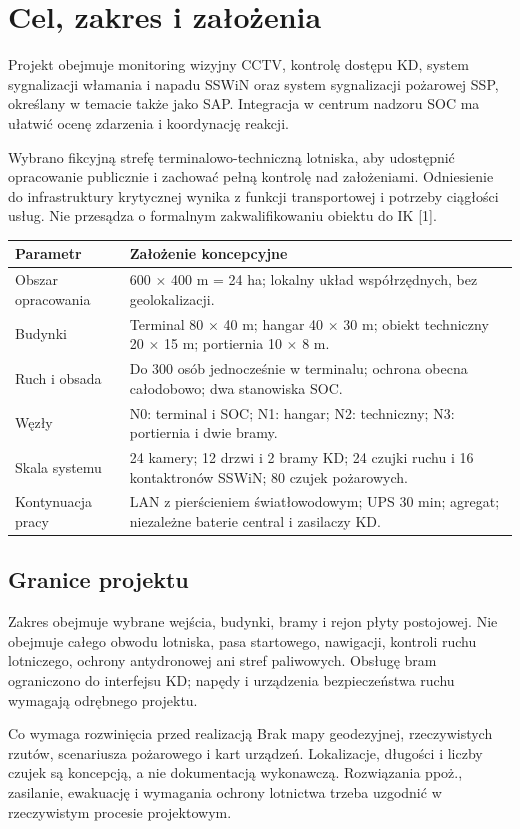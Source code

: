\section{Cel, zakres i założenia}
Projekt obejmuje monitoring wizyjny CCTV, kontrolę dostępu KD, system sygnalizacji włamania i napadu SSWiN oraz system sygnalizacji pożarowej SSP, określany w temacie także jako SAP. Integracja w centrum nadzoru SOC ma ułatwić ocenę zdarzenia i koordynację reakcji.

Wybrano fikcyjną strefę terminalowo-techniczną lotniska, aby udostępnić opracowanie publicznie i zachować pełną kontrolę nad założeniami. Odniesienie do infrastruktury krytycznej wynika z funkcji transportowej i potrzeby ciągłości usług. Nie przesądza o formalnym zakwalifikowaniu obiektu do IK [1].

\begin{tabularx}{\linewidth}{@{}P{42mm}Y@{}}
\toprule\textbf{Parametr} & \textbf{Założenie koncepcyjne}\\\midrule
Obszar opracowania & 600 $\times$ 400 m = 24 ha; lokalny układ współrzędnych, bez geolokalizacji.\\
Budynki & Terminal 80 $\times$ 40 m; hangar 40 $\times$ 30 m; obiekt techniczny 20 $\times$ 15 m; portiernia 10 $\times$ 8 m.\\
Ruch i obsada & Do 300 osób jednocześnie w terminalu; ochrona obecna całodobowo; dwa stanowiska SOC.\\
Węzły & N0: terminal i SOC; N1: hangar; N2: techniczny; N3: portiernia i dwie bramy.\\
Skala systemu & 24 kamery; 12 drzwi i 2 bramy KD; 24 czujki ruchu i 16 kontaktronów SSWiN; 80 czujek pożarowych.\\
Kontynuacja pracy & LAN z pierścieniem światłowodowym; UPS 30 min; agregat; niezależne baterie central i zasilaczy KD.\\\bottomrule
\end{tabularx}

\subsection*{Granice projektu}
Zakres obejmuje wybrane wejścia, budynki, bramy i rejon płyty postojowej. Nie obejmuje całego obwodu lotniska, pasa startowego, nawigacji, kontroli ruchu lotniczego, ochrony antydronowej ani stref paliwowych. Obsługę bram ograniczono do interfejsu KD; napędy i urządzenia bezpieczeństwa ruchu wymagają odrębnego projektu.

\begin{note}{Co wymaga rozwinięcia przed realizacją}
Brak mapy geodezyjnej, rzeczywistych rzutów, scenariusza pożarowego i kart urządzeń. Lokalizacje, długości i liczby czujek są koncepcją, a nie dokumentacją wykonawczą. Rozwiązania ppoż., zasilanie, ewakuację i wymagania ochrony lotnictwa trzeba uzgodnić w rzeczywistym procesie projektowym.
\end{note}
